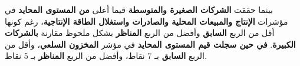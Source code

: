 بينما حققت \textbf{الشركات الصغيرة والمتوسطة} قيما أعلى \textbf{من المستوى المحايد} في مؤشرات \textbf{الإنتاج والمبيعات المحلية والصادرات واستغلال الطاقة الإنتاجية}، رغم كونها أقل من الربع \textbf{السابق} وأفضل من الربع \textbf{المناظر} بشكل ملحوظ مقارنة \textbf{بالشركات الكبيرة}. \textbf{في حين سجلت قيم المستوى المحايد} في مؤشر \textbf{المخزون السلعي}، وأقل من الربع \textbf{السابق} بـ 7 نقاط، وأفضل من الربع \textbf{المناظر} بـ 5 نقاط.
